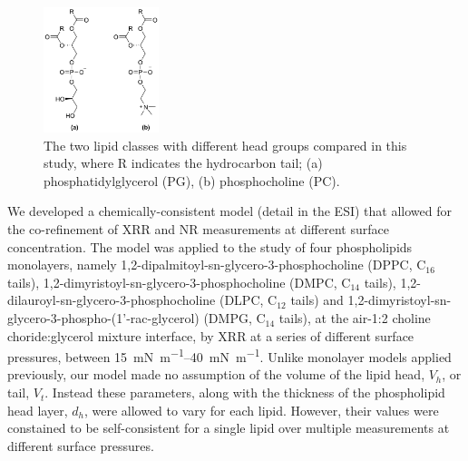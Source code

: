 \documentclass[twocolumn,a4paper]{paper}
\begin{document}
%
\begin{figure}
\centering
\includegraphics[width=0.3\textwidth]{figures/head_groups}
\caption{\label{fig:heads}\small The two lipid classes with different head groups compared in this study, where R indicates the hydrocarbon tail; (a) phosphatidylglycerol (PG), (b) phosphocholine (PC).}
\end{figure}
%
We developed a chemically-consistent model (detail in the ESI) that allowed for the co-refinement of XRR and NR measurements at different surface concentration.
The model was applied to the study of four phospholipids monolayers, namely 1,2-dipalmitoyl-sn-glycero-3-phosphocholine (DPPC, C$_{16}$ tails), 1,2-dimyristoyl-sn-glycero-3-phosphocholine (DMPC, C$_{14}$ tails),  1,2-dilauroyl-sn-glycero-3-phosphocholine (DLPC, C$_{12}$ tails) and 1,2-dimyristoyl-sn-glycero-3-phospho-(1'-rac-glycerol) (DMPG, C$_{14}$ tails), at the air-1:2 choline choride:glycerol mixture interface, by XRR at a series of different surface pressures, between \SIrange{15}{40}{\milli\newton\per\meter}.
Unlike monolayer models applied previously\cite{Mohwald1990,Kewalramani2010,Bayerl1990,Johnson1991,Clifton2012,Helm1987,Daillant1990}, our model made no assumption of the volume of the lipid head, $V_h$, or tail, $V_t$.
Instead these parameters, along with the thickness of the phospholipid head layer, $d_h$, were allowed to vary for each lipid.
However, their values were constained to be self-consistent for a single lipid over multiple measurements at different surface pressures.
\end{document}
